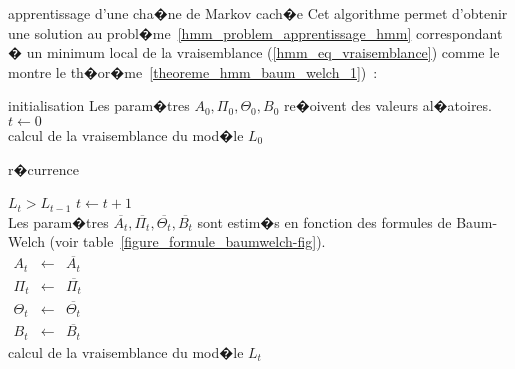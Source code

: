         \begin{xalgorithm} {apprentissage d'une cha�ne de Markov cach�e}
        \label{hmm_algorithme_baumwelch}
        Cet algorithme permet d'obtenir une solution au probl�me~\ref{hmm_problem_apprentissage_hmm} 
        correspondant � un minimum local
         de la vraisemblance (\ref{hmm_eq_vraisemblance}) comme le
        montre le th�or�me~\ref{theoreme_hmm_baum_welch_1})~:
        
        \begin{xalgostep}{initialisation}
                Les param�tres $A_0, \Pi_0, \Theta_0, B_0$ re�oivent des valeurs al�atoires.\\
                $t \longleftarrow 0$ \\
                calcul de la vraisemblance du mod�le $L_0$
        \end{xalgostep}
        
        \begin{xalgostep}{r�currence} \label{hmm_algo_apprentissage_step_recurrence}
                \begin{xwhile}{$L_{t} > L_{t-1}$}
                        $t \longleftarrow t+1$ \\
                        Les param�tres $\overline{A_{t}}, \overline{\Pi_{t}}, \overline{\Theta_{t}},
                         \overline{B_{t}}$ sont estim�s en fonction des formules de Baum-Welch
                        (voir table~\ref{figure_formule_baumwelch-fig}).\\
                        $
                        \begin{array}{lll}
                        A_t             & \longleftarrow & \overline{A_{t}} \\
                        \Pi_t           & \longleftarrow & \overline{\Pi_{t}} \\
                        \Theta_t        & \longleftarrow & \overline{\Theta_{t}} \\
                        B_t             & \longleftarrow & \overline{B_{t}}
                        \end{array}
                        $ \\
                        calcul de la vraisemblance du mod�le $L_t$
                \end{xwhile}
        \end{xalgostep}
        
        \end{xalgorithm}
        

